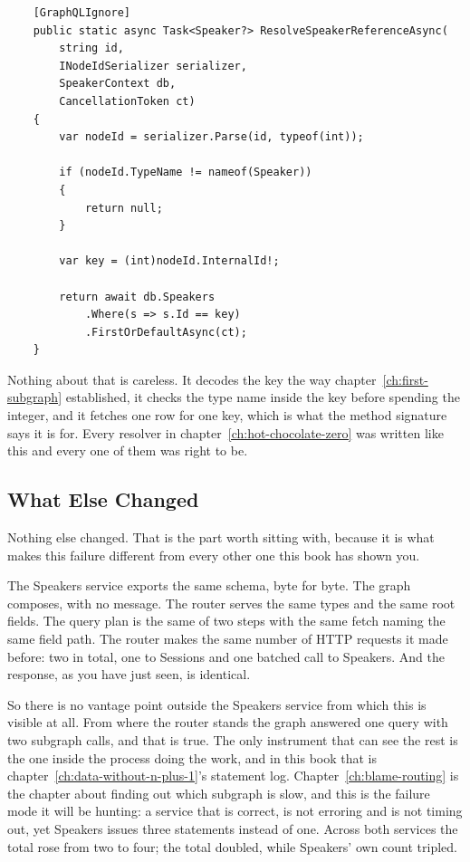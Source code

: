 \begin{verbatim}
    [GraphQLIgnore]
    public static async Task<Speaker?> ResolveSpeakerReferenceAsync(
        string id,
        INodeIdSerializer serializer,
        SpeakerContext db,
        CancellationToken ct)
    {
        var nodeId = serializer.Parse(id, typeof(int));

        if (nodeId.TypeName != nameof(Speaker))
        {
            return null;
        }

        var key = (int)nodeId.InternalId!;

        return await db.Speakers
            .Where(s => s.Id == key)
            .FirstOrDefaultAsync(ct);
    }
\end{verbatim}

%
Nothing about that is careless. It decodes the key the way
chapter~\ref{ch:first-subgraph} established, it checks the type name inside the
key before spending the integer, and it fetches one row for one key, which is
what the method signature says it is for. Every resolver in
chapter~\ref{ch:hot-chocolate-zero} was written like this and every one of them
was right to be.

\subsection{What Else Changed}

%
Nothing else changed. That is the part worth sitting with, because it is what
makes this failure different from every other one this book has shown you.

%
The Speakers service exports the same schema, byte for byte. The graph
composes, with no message. The router serves the same types and the same root
fields. The query plan is the same  of two steps with the same
 fetch naming the same field path. The router makes the same
number of HTTP requests it made before: two in total, one to Sessions and
one batched call to Speakers. And the response, as you
have just seen, is identical.

%
So there is no vantage point outside the Speakers service from which this is
visible at all. From where the router stands the graph answered one query with
two subgraph calls, and that is true. The only instrument that can see the rest
is the one inside the process doing the work, and in this book that is
chapter~\ref{ch:data-without-n-plus-1}'s statement log.
Chapter~\ref{ch:blame-routing} is the chapter about finding out which subgraph
is slow, and this is the failure mode it will be hunting: a service that is
correct, is not erroring and is not timing out, yet Speakers issues three
statements instead of one. Across both services the total rose from two to
four; the total doubled, while Speakers' own count tripled.

